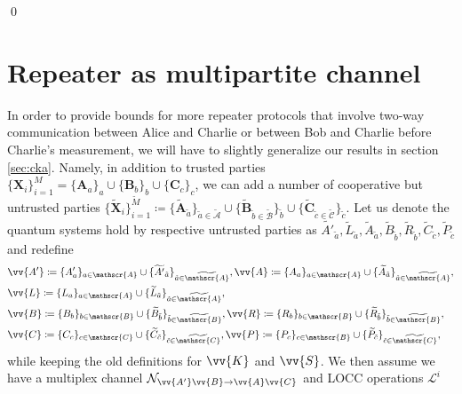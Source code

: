 \documentclass[aps,pra,twocolumn,superscriptaddress,longbibliography]{revtex4-1}
\newcommand{\mc}[1]{\mathcal{#1}}
\newcommand{\tf}[1]{\textbf{#1}}
\newcommand{\msc}[1]{\mathscr{#1}}
\begin{document}
\begin{appendix}
\qed



\section{Repeater as multipartite channel}\label{App:Repeater}
In order to provide bounds for more repeater protocols that involve two-way communication between Alice and Charlie or between Bob and Charlie before Charlie's measurement, we will have to slightly generalize our results in section \ref{sec:cka}. Namely, in addition to trusted parties $\{\tf{X}_i\}_{i=1}^M= \{\tf{A}_a\}_a\cup\{\tf{B}_b\}_b\cup\{\tf{C}_c\}_c$, we can add a number of cooperative but untrusted parties $\{\widetilde{\tf{X}}_i\}_{i=1}^{\widetilde{M}}\coloneqq \{\widetilde{\tf{A}}_{\tilde a}\}_{\tilde a\in \widetilde{\msc{A}}}\cup\{\widetilde{\tf{B}}_{\tilde b\in \widetilde{\msc{B}}}\}_{\tilde b}\cup\{\widetilde{\tf{C}}_{\tilde c\in \widetilde{\msc{C}}}\}_{\tilde c}$. %
Let us denote the quantum systems hold by respective untrusted parties as $\widetilde{A'}_{\tilde a}, \widetilde{L}_{\tilde a},\widetilde{A}_{\tilde a}, \widetilde{B}_{\tilde b}, \widetilde{R}_{\tilde b},\widetilde{C}_{\tilde c},\widetilde{P}_{\tilde c}$ and redefine 
\begin{align*}
&\vv{A'}\coloneqq \{A'_a\}_{a\in\msc{A}}\cup\{\widetilde{A'}_{\tilde{a}}\}_{\tilde{a}\in\widetilde{\msc{A}}},
\vv{A}\coloneqq \{A_a\}_{a\in\msc{A}}\cup\{\widetilde{A}_{\tilde{a}}\}_{\tilde{a}\in\widetilde{\msc{A}}},\\
&\vv{L}\coloneqq \{L_a\}_{a\in\msc{A}}\cup\{\widetilde{L}_{\tilde{a}}\}_{\tilde{a}\in\widetilde{\msc{A}}},\\
&\vv{B}\coloneqq \{B_b\}_{b\in\msc{B}}\cup\{\widetilde{B}_{\tilde{b}}\}_{\tilde{b}\in\widetilde{\msc{B}}},
\vv{R}\coloneqq \{R_b\}_{b\in\msc{B}}\cup\{\widetilde{R}_{\tilde{b}}\}_{\tilde{b}\in\widetilde{\msc{B}}},\\
&\vv{C}\coloneqq \{C_c\}_{c\in\msc{C}}\cup\{\widetilde{C}_{\tilde{c}}\}_{\tilde{c}\in\widetilde{\msc{C}}},
\vv{P}\coloneqq \{P_c\}_{c\in\msc{B}}\cup\{\widetilde{P}_{\tilde{c}}\}_{\tilde{c}\in\widetilde{\msc{C}}},
\end{align*} 
while keeping the old definitions for $\vv{K}$ and $\vv{S}$. We then assume we have a multiplex channel $\mc{N}_{\vv{A'}\vv{B}\to\vv{A}\vv{C}}$ and LOCC operations $\mc{L}^i$%

\end{appendix}
\end{document}
